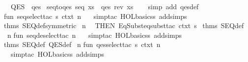 \begin{isabellebody}
\ \ {}QES\ {}\ qes{}\isanewline
\isanewline
{}\isamarkupfalse%
\ seq{}to{}qes{}\ {}seq\ xs\ {}\ qes\ {}rev\ xs{}{}\isanewline
%
\isadelimproof
\ \ %
\endisadelimproof
%
\isatagproof
{}\isamarkupfalse%
\ {}simp\ add{}\ qes{}def{}%
\endisatagproof
{\isafoldproof}%
%
\isadelimproof
\isanewline
%
\endisadelimproof
%
\isadelimML
\isanewline
%
\endisadelimML
%
\isatagML
{}\isamarkupfalse%
\ {}\isanewline
fun\ seq{}select{}tac\ s\ ctxt\ n\ {}\isanewline
\ \ simp{}tac\ {}HOL{}basic{}ss\ addsimps\ %
\isaantiq
thms\ SEQ{}def{}symmetric{}{}%
\endisaantiq
{}\ n\isanewline
\ \ THEN\ EqSubst{}eqsubst{}tac\ ctxt\ {}s{}\ %
\isaantiq
thms\ SEQ{}def{}%
\endisaantiq
\ n\isanewline
\isanewline
fun\ seq{}deselect{}tac\ n\ {}\isanewline
\ \ simp{}tac\ {}HOL{}basic{}ss\ addsimps\ %
\isaantiq
thms\ SEQ{}def\ QES{}def{}%
\endisaantiq
{}\ n\isanewline
\isanewline
fun\ qes{}select{}tac\ s\ ctxt\ n\ {}\isanewline
\ \ simp{}tac\ {}HOL{}basic{}ss\ addsimps\ %

\end{isabellebody}
